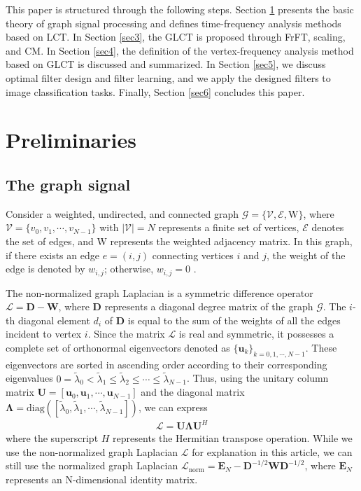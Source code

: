 \documentclass[lettersize,journal]{IEEEtran}
\begin{document}
This paper is structured through the following steps. Section \ref{sec2} presents the basic theory of graph signal processing and defines time-frequency analysis methods based on LCT. In Section \ref{sec3}, the GLCT is proposed through FrFT, scaling, and CM. In Section \ref{sec4}, the definition of the vertex-frequency analysis method based on GLCT is discussed and summarized. In Section \ref{sec5}, we discuss optimal filter design and filter learning, and we apply the designed filters to image classification tasks.
Finally, Section \ref{sec6} concludes this paper.


\section{Preliminaries}
\label{sec2}
\subsection{The graph signal}
Consider a weighted, undirected, and connected graph $\mathcal{G}=\{\mathcal{V}, \mathcal{E}, \mathrm{W}\}$, where $\mathcal{V}=\{v_0,v_1,\cdots,v_{N-1}\}$ with $|\mathcal{V}|=N$ represents a finite set of vertices, $\mathcal{E}$ denotes the set of edges, and $\mathrm{W}$ represents the weighted adjacency matrix. In this graph, if there exists an edge $e=(i,j)$ connecting vertices $i$ and $j$, the weight of the edge is denoted by $w_{i,j}$; otherwise, $w_{i,j}=0$ \cite{shuman2013emmerging}.

The non-normalized graph Laplacian is a symmetric difference operator $\mathcal{L}=\mathbf{D}-\mathbf{W}$, where $\mathbf{D}$ represents a diagonal degree matrix of the graph $\mathcal{G}$. The $i$-th diagonal element $d_i$ of $\mathbf{D}$ is equal to the sum of the weights of all the edges incident to vertex $i$. 
Since the matrix $\mathcal{L}$ is real and symmetric, it possesses a complete set of orthonormal eigenvectors denoted as $\{\mathbf{u}_k\}_{k=0,1,\cdots,N-1}$. These eigenvectors are sorted in ascending order according to their corresponding eigenvalues $0=\widetilde{\lambda}_0<\widetilde{\lambda}_1\leq \widetilde{\lambda}_2 \leq \cdots \leq \widetilde{\lambda}_{N-1}$.
Thus, using the unitary column matrix $\mathbf{U}=\left[\mathbf{u}_0,\mathbf{u}_1,\cdots,\mathbf{u}_{N-1}\right]$ and the diagonal matrix $\boldsymbol{\Lambda}=\mathrm{diag}\left(\left[\widetilde{\lambda}_0, \widetilde{\lambda}_1, \cdots, \widetilde{\lambda}_{N-1}\right]\right)$, we can express 
\begin{align}
	\mathcal{L}=\mathbf{U} \boldsymbol{\Lambda} \mathbf{U}^H
\end{align}
where the superscript $H$ represents the Hermitian transpose operation. 
While we use the non-normalized graph Laplacian $\mathcal{L}$ for explanation in this article, we can still use the normalized graph Laplacian $\mathcal{L}_{\text{norm}} = \mathbf{E}_N - \mathbf{D}^{-1/2} \mathbf{W} \mathbf{D}^{-1/2}$, where $\mathbf{E}_N$ represents an N-dimensional identity matrix\cite{shuman2020localized}.
\end{document}
